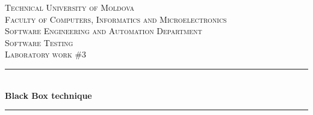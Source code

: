 \begin{titlepage}

  \begin{center} %

  \textsc{\large Technical University of Moldova}\\[0.5cm] 
  \textsc{\large Faculty of Computers, Informatics and Microelectronics}\\[0.5cm]
  \textsc{\large Software Engineering and Automation Department}\\[0.5cm]
  \vspace{25 mm}
  \textsc{\Large Software Testing}\\[0.5cm] %
  \textsc{\large Laboratory work \#3}\\[0.5cm] %

  \newcommand{\HRule}{\rule{\linewidth}{0.5mm}} %

  \vspace{10 mm}
  \HRule \\[0.4cm]
  { \LARGE \bfseries Black Box technique }\\[0.4cm] %
  \HRule \\[1.5cm]

      \vspace{30mm}


\end{center}
\end{titlepage}

